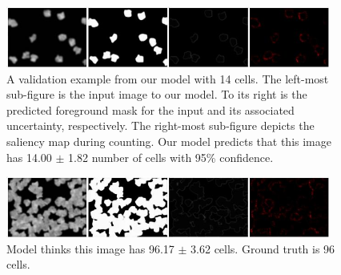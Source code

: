 \documentclass[a0]{a0poster}
\begin{document}
\begin{textblock}{7.0}
\vspace{5mm}
\begin{figure}[!h]
\centering
\includegraphics[width=0.95\textwidth]{good-1}
\caption{A validation example from our model with 14 cells.
The left-most sub-figure is the input image to our model.
To its right is the predicted foreground mask for the input and its associated uncertainty, respectively.
The right-most sub-figure depicts the saliency map during counting.
Our model predicts that this image has 14.00 $\pm$ 1.82 number of cells with 95\% confidence.}
\end{figure}
\vspace{5mm}
\begin{figure}[!h]
\centering
\includegraphics[width=0.95\textwidth]{good-2}
\caption{Model thinks this image has 96.17 $\pm$ 3.62 cells. Ground truth is 96 cells.}
\end{figure}

\end{textblock}
\end{document}
